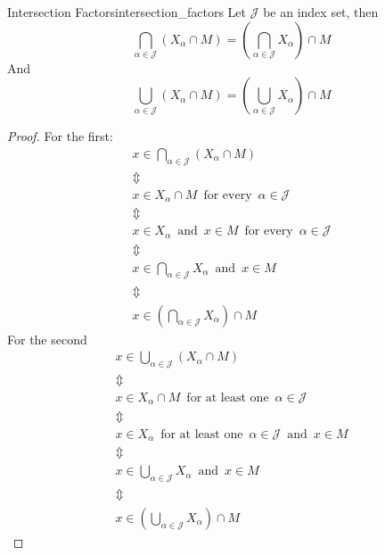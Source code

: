 \begin{proposition}{Intersection Factors}{intersection_factors}
Let \( \mathcal{ J }   \) be an index set, then
\[
\bigcap _{ \alpha \in \mathcal{ J }   } \left( X _{ \alpha  } \cap M \right) =
\left( \bigcap _{ \alpha \in \mathcal{ J }   } X _{ \alpha  }  \right) \cap M
\]
And 
\[
\bigcup _{ \alpha \in \mathcal{ J }   } \left( X _{ \alpha  } \cap M \right)  =
\left( \bigcup _{ \alpha \in \mathcal{
J}   } X _{ \alpha  }  \right) \cap M
\]
\end{proposition}
\begin{proof}
    For the first: 
    \begin{gather*}
         x \in \bigcap _{ \alpha \in \mathcal{ J }   } \left( X _{ \alpha  } \cap
        M\right)  \\
        \Updownarrow \\
        x \in X _{ \alpha  } \cap M  \enspace \text{for every} \enspace \alpha
        \in \mathcal{ J } \\
        \Updownarrow \\
        x \in X _{ \alpha  } \enspace \text{and} \enspace  x \in  M \enspace
        \text{for every} \enspace    \alpha \in \mathcal{ J }    \\
        \Updownarrow \\
        x \in  \bigcap _{ \alpha \in \mathcal{ J }   } X _{ \alpha  }  \enspace
        \text{and} \enspace x \in  M \\
        \Updownarrow \\
         x \in  \left( \bigcap _{ \alpha \in \mathcal{ J }   } X _{ \alpha  }
         \right) \cap M 
    \end{gather*}
    For the second
    \begin{gather*}
        x \in \bigcup _{ \alpha \in \mathcal{ J }   } \left( X _{ \alpha  } \cap
        M\right) \\
        \Updownarrow \\
        x \in X _{ \alpha  } \cap M \enspace \text{for at least one} \enspace
        \alpha \in \mathcal{ J }  \\
        \Updownarrow \\
        x \in  X _{ \alpha  } \enspace \text{for at least one} \enspace \alpha
        \in  \mathcal{ J } \enspace \text{and} \enspace x \in  M  \\
        \Updownarrow \\
        x \in \bigcup _{ \alpha \in \mathcal{ J }   } X _{ \alpha  } \enspace
        \text{and} \enspace x \in  M \\
        \Updownarrow \\
        x \in  \left( \bigcup _{ \alpha \in \mathcal{ J }   } X _{ \alpha  }
        \right) \cap  M
    \end{gather*}
\end{proof}
